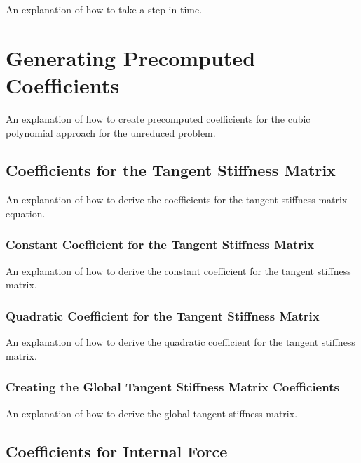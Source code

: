 \documentclass[twocolumn,10pt]{asme2ej}
\begin{document}
An explanation of how to take a step in time.

\section{Generating Precomputed Coefficients}

An explanation of how to create precomputed coefficients for the cubic polynomial approach for the unreduced problem.

\subsection{Coefficients for the Tangent Stiffness Matrix}

An explanation of how to derive the coefficients for the tangent stiffness matrix equation.

\subsubsection{Constant Coefficient for the Tangent Stiffness Matrix}

An explanation of how to derive the constant coefficient for the tangent stiffness matrix.

\subsubsection{Quadratic Coefficient for the Tangent Stiffness Matrix}

An explanation of how to derive the quadratic coefficient for the tangent stiffness matrix.

\subsubsection{Creating the Global Tangent Stiffness Matrix Coefficients}

An explanation of how to derive the global tangent stiffness matrix.

\subsection{Coefficients for Internal Force}
\end{document}
